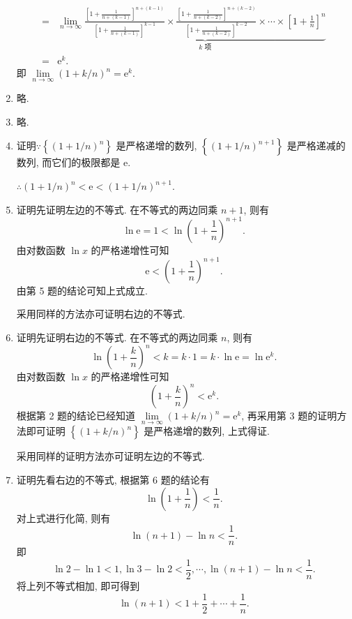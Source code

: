 \begin{enumerate}
\begin{align*}
            ={} & \lim_{n\to\infty}\underbrace{\frac{\left[1 + \frac{1}{n+(k-1)}\right]^{n+(k-1)}}{\left[1 + \frac{1}{n+(k-1)}\right]^{k-1}} \times \frac{\left[1 + \frac{1}{n+(k-2)}\right]^{n+(k-2)}}{\left[1 + \frac{1}{n+(k-2)}\right]^{k-2}} \times \cdots \times \left[1 + \frac 1n\right]^n}_{\text{$k$ 项}} \\
            ={} & \mathrm{e}^k.
        \end{align*}
        即 $\lim\limits_{n\to\infty}\left(1 + k/n\right)^n = \mathrm{e}^k$.
    \item 略.
    \item 略.
    \item {\heiti 证明}\quad $\because \left\{\left(1 + 1/n\right)^n\right\}$ 是严格递增的数列, $\left\{\left(1 + 1/n\right)^{n+1}\right\}$ 是严格递减的数列,
        而它们的极限都是 $\mathrm{e}$.
        
        $\therefore \left(1 + 1/n\right)^n < \mathrm{e} < \left(1 + 1/n\right)^{n+1}$.
    \item {\heiti 证明}\quad 先证明左边的不等式. 在不等式的两边同乘 $n + 1$, 则有
        \begin{equation*}
            \ln\mathrm{e} = 1 < \ln\left(1 + \frac 1n\right)^{n+1}.    
        \end{equation*}
        由对数函数 $\ln x$ 的严格递增性可知
        \begin{equation*}
            \mathrm{e} < \left(1 + \frac 1n\right)^{n+1}.
        \end{equation*}
        由第 5 题的结论可知上式成立.
        
        采用同样的方法亦可证明右边的不等式.
    \item {\heiti 证明}\quad 先证明右边的不等式. 在不等式的两边同乘 $n$, 则有
        \begin{equation*}
            \ln\left(1 + \frac kn\right)^n < k = k \cdot 1 = k \cdot \ln\mathrm{e} = \ln\mathrm{e}^k.
        \end{equation*}
        由对数函数 $\ln x$ 的严格递增性可知
        \begin{equation*}
            \left(1 + \frac kn\right)^n < \mathrm{e}^k.
        \end{equation*}
        根据第 2 题的结论已经知道 $\lim\limits_{n\to\infty}\left(1 + k/n\right)^n = \mathrm{e}^k$, 再采用第 3 题的证明方法即可证明 $\left\{\left(1 + k/n\right)^n\right\}$ 是严格递增的数列,
        上式得证.
        
        采用同样的证明方法亦可证明左边的不等式.
    \item {\heiti 证明}\quad 先看右边的不等式, 根据第 6 题的结论有
        \[
            \ln\left(1 + \frac 1n\right) < \frac 1n.
        \]
        对上式进行化简, 则有
        \[
            \ln(n+1)-\ln n < \frac 1n.    
        \]
        即
        \begin{equation*}
            \ln2 - \ln1 < 1,
            \ln3 - \ln2 < \frac 12,
            \cdots,
            \ln(n+1) - \ln n < \frac 1n.
        \end{equation*}
        将上列不等式相加, 即可得到
        \[
            \ln(n + 1) < 1 + \frac 12 + \cdots + \frac 1n.    
        \]


\end{enumerate}

